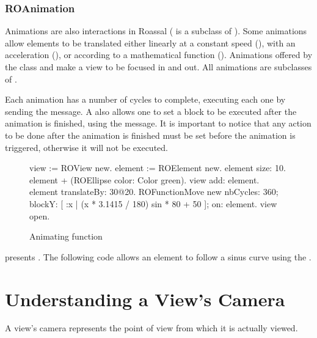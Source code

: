 \documentclass[a4paper,10pt,twoside]{book}
\begin{document}
\subsubsection{ROAnimation}
Animations are also interactions in Roassal (\ie {} is a subclass of ). Some animations allow elements to be translated either linearly at a constant speed (), with an acceleration (), or according to a mathematical function (). Animations offered by the class  and  make a view to be focused in and out. All animations are subclasses of .

Each animation has a number of cycles to complete, executing each one by sending the  message.
A  also allows one to set a block to be executed after the animation is finished, using the  message. It is important to notice that any action to be done after the animation is finished must be set before the animation is triggered, otherwise it will not be executed. %

\begin{figure}[H]
\begin{code}{}
view := ROView new.
element := ROElement new.
element size: 10.
element + (ROEllipse color: Color green).
view add: element.
element translateBy: 30@20.
ROFunctionMove new
	nbCycles: 360;
	blockY: [ :x | (x * 3.1415 / 180) sin * 80 + 50 ];
	on: element.
view open.
\end{code}
\caption{Animating function}\label{fig:animationCode}
\end{figure}

 presents . The following code allows an element to follow a sinus curve using the .





\section{Understanding a View's Camera} 

A view's camera represents the point of view from which it is actually viewed. 
\end{document}
